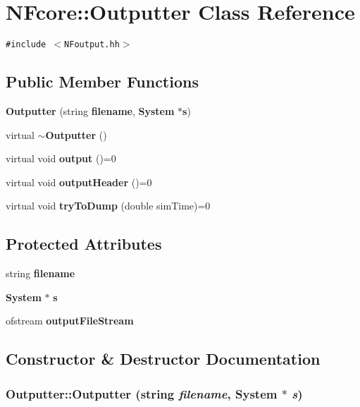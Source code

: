 \section{NFcore::Outputter Class Reference}
\label{classNFcore_1_1Outputter}
{\tt \#include $<$NFoutput.hh$>$}

\subsection*{Public Member Functions}
\begin{CompactItemize}
\item 
{\bf Outputter} (string {\bf filename}, {\bf System} $\ast${\bf s})
\item 
virtual {\bf $\sim$Outputter} ()
\item 
virtual void {\bf output} ()=0
\item 
virtual void {\bf outputHeader} ()=0
\item 
virtual void {\bf tryToDump} (double simTime)=0
\end{CompactItemize}
\subsection*{Protected Attributes}
\begin{CompactItemize}
\item 
string {\bf filename}
\item 
{\bf System} $\ast$ {\bf s}
\item 
ofstream {\bf outputFileStream}
\end{CompactItemize}


\subsection{Constructor \& Destructor Documentation}
\subsubsection{\setlength{\rightskip}{0pt plus 5cm}Outputter::Outputter (string {\em filename}, {\bf System} $\ast$ {\em s})}\label{classNFcore_1_1Outputter_92551e7d729d3fba3f52600c2d23a7f8}


